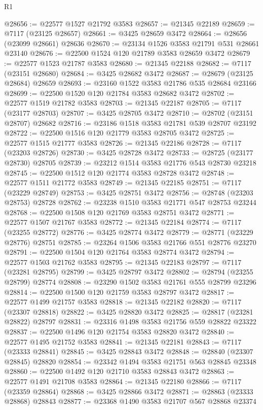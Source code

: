 \begin{lexlean}{R1}
\begin{coremodule}
@28656 := @22577 @1527 @21792 @3583
@28657 := @21345 @22189
@28659 := @7117 (@23125 @28657)
@28661 := @3425 @28659 @3472
@28664 := @28656 (@23099 @28661) @28636
@28670 := @23134 @1526 @3583 @21791 @531 @28661 @23140
@28676 := @22500 @1524 @120 @21789 @3583 @28659 @3472
@28679 := @22577 @1523 @21787 @3583
@28680 := @21345 @22188
@28682 := @7117 (@23151 @28680)
@28684 := @3425 @28682 @3472
@28687 := @28679 (@23125 @28684) @28659
@28693 := @23160 @1522 @3583 @21786 @535 @28684 @23166
@28699 := @22500 @1520 @120 @21784 @3583 @28682 @3472
@28702 := @22577 @1519 @21782 @3583
@28703 := @21345 @22187
@28705 := @7117 (@23177 @28703)
@28707 := @3425 @28705 @3472
@28710 := @28702 (@23151 @28707) @28682
@28716 := @23186 @1518 @3583 @21781 @539 @28707 @23192
@28722 := @22500 @1516 @120 @21779 @3583 @28705 @3472
@28725 := @22577 @1515 @21777 @3583
@28726 := @21345 @22186
@28728 := @7117 (@23203 @28726)
@28730 := @3425 @28728 @3472
@28733 := @28725 (@23177 @28730) @28705
@28739 := @23212 @1514 @3583 @21776 @543 @28730 @23218
@28745 := @22500 @1512 @120 @21774 @3583 @28728 @3472
@28748 := @22577 @1511 @21772 @3583
@28749 := @21345 @22185
@28751 := @7117 (@23229 @28749)
@28753 := @3425 @28751 @3472
@28756 := @28748 (@23203 @28753) @28728
@28762 := @23238 @1510 @3583 @21771 @547 @28753 @23244
@28768 := @22500 @1508 @120 @21769 @3583 @28751 @3472
@28771 := @22577 @1507 @21767 @3583
@28772 := @21345 @22184
@28774 := @7117 (@23255 @28772)
@28776 := @3425 @28774 @3472
@28779 := @28771 (@23229 @28776) @28751
@28785 := @23264 @1506 @3583 @21766 @551 @28776 @23270
@28791 := @22500 @1504 @120 @21764 @3583 @28774 @3472
@28794 := @22577 @1503 @21762 @3583
@28795 := @21345 @22183
@28797 := @7117 (@23281 @28795)
@28799 := @3425 @28797 @3472
@28802 := @28794 (@23255 @28799) @28774
@28808 := @23290 @1502 @3583 @21761 @555 @28799 @23296
@28814 := @22500 @1500 @120 @21759 @3583 @28797 @3472
@28817 := @22577 @1499 @21757 @3583
@28818 := @21345 @22182
@28820 := @7117 (@23307 @28818)
@28822 := @3425 @28820 @3472
@28825 := @28817 (@23281 @28822) @28797
@28831 := @23316 @1498 @3583 @21756 @559 @28822 @23322
@28837 := @22500 @1496 @120 @21754 @3583 @28820 @3472
@28840 := @22577 @1495 @21752 @3583
@28841 := @21345 @22181
@28843 := @7117 (@23333 @28841)
@28845 := @3425 @28843 @3472
@28848 := @28840 (@23307 @28845) @28820
@28854 := @23342 @1494 @3583 @21751 @563 @28845 @23348
@28860 := @22500 @1492 @120 @21710 @3583 @28843 @3472
@28863 := @22577 @1491 @21708 @3583
@28864 := @21345 @22180
@28866 := @7117 (@23359 @28864)
@28868 := @3425 @28866 @3472
@28871 := @28863 (@23333 @28868) @28843
@28877 := @23368 @1490 @3583 @21707 @567 @28868 @23374

\end{coremodule}
\end{lexlean}
